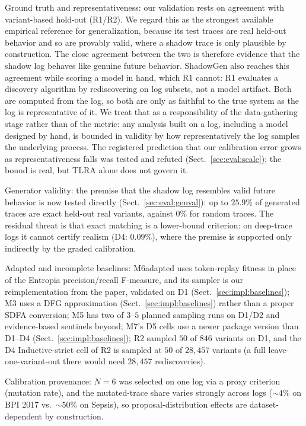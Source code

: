 \documentclass[runningheads]{llncs}
\newcommand{\chg}[1]{\textcolor{chgblue}{#1}}
\begin{document}
Ground truth and representativeness: our validation rests on agreement with variant-based hold-out (R1/R2). We regard this as the strongest available empirical reference for generalization, because its test traces are real held-out behavior and so are provably valid, where a shadow trace is only plausible by construction. The close agreement between the two is therefore evidence that the shadow log behaves like genuine future behavior. ShadowGen also reaches this agreement while scoring a model in hand, which R1 cannot: R1 evaluates a discovery algorithm by rediscovering on log subsets, not a model artifact. Both are computed from the log, so both are only as faithful to the true system as the log is representative of it. We treat that as a responsibility of the data-gathering stage rather than of the metric: any analysis built on a log, including a model designed by hand, is bounded in validity by how representatively the log samples the underlying process. \chg{The registered prediction that our calibration error grows as representativeness falls was tested and refuted (Sect.~\ref{sec:eval:scale}); the bound is real, but TLRA alone does not govern it.}

\chg{Generator validity: the premise that the shadow log resembles valid future behavior is now tested directly (Sect.~\ref{sec:eval:genval}): up to $25.9\%$ of generated traces are exact held-out real variants, against $0\%$ for random traces. The residual threat is that exact matching is a lower-bound criterion: on deep-trace logs it cannot certify realism (D4: $0.09\%$), where the premise is supported only indirectly by the graded calibration.}

Adapted and incomplete baselines: M6adapted uses token-replay fitness in place of the Entropia precision/recall F-measure\chg{, and its sampler is our reimplementation from the paper, validated on D1} (Sect.~\ref{sec:impl:baselines}); M3 uses a DFG approximation (Sect.~\ref{sec:impl:baselines}) rather than a proper SDFA conversion; M5 has two of $3$--$5$ planned sampling runs \chg{on D1/D2 and evidence-based sentinels beyond}; \chg{M7's D5 cells use a newer package version than D1--D4 (Sect.~\ref{sec:impl:baselines})}; R2 sampled $50$ of $846$ variants on D1\chg{, and the D4 Inductive-strict cell of R2 is sampled at $50$ of $28{,}457$ variants (a full leave-one-variant-out there would need $28{,}457$ rediscoveries)}.

Calibration provenance: $N{=}6$ was selected on one log via a proxy criterion (mutation rate), and the mutated-trace share varies strongly across logs ($\sim4\%$ on BPI 2017 vs.\ $\sim50\%$ on Sepsis), so proposal-distribution effects are dataset-dependent by construction.
\end{document}
